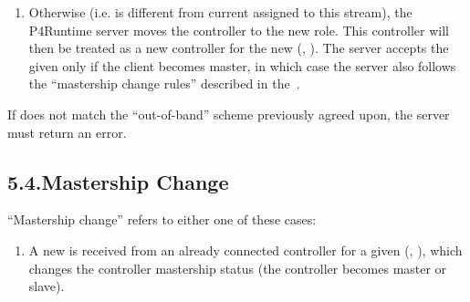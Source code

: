 \documentclass[11pt]{article}
\begin{document}
{\begin{enumerate}
\begin{enumerate}
\item{}
Otherwise (i.e.  is different from current  assigned to
this stream), the P4Runtime server moves the controller to the new role.
This controller will then be treated as a new controller for the new
(, ). The server accepts the given  only
if the client becomes master, in which case the server also follows the
\textquotedblleft{}mastership change rules\textquotedblright{} described in the~.%
\end{enumerate}%
\end{enumerate}%

\noindent{}If  does not match the \textquotedblleft{}out-of-band\textquotedblright{} scheme previously agreed upon,
the server must return an  error.%

\subsection{5.4.\hspace*{0.5em}Mastership Change}\label{sec-master-change}%

\noindent{}\textquotedblleft{}Mastership change\textquotedblright{} refers to either one of these cases:%

\begin{enumerate}%

\item{}
A new  is received from an already connected
controller for a given (, ), which changes the controller
mastership status (the controller becomes master or slave).%


\end{enumerate}}
\end{document}
